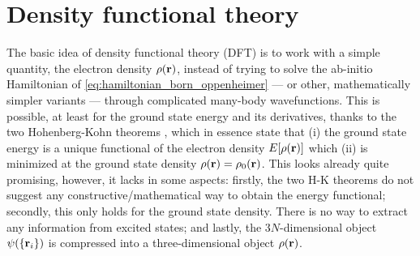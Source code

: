 \documentclass[../../main.tex]{subfiles}
\begin{document}
\section{Density functional theory}\label{sec:dft}

The basic idea of density functional theory (DFT) is to work with a simple quantity, the electron density $\rho(\textbf{r})$, instead of trying to solve the ab-initio Hamiltonian of \eqref{eq:hamiltonian_born_oppenheimer} --- or other, mathematically simpler variants --- through complicated many-body wavefunctions. This is possible, at least for the ground state energy and its derivatives, thanks to the two Hohenberg-Kohn theorems \cite{Hohenberg1964}, which in essence state that (i) the ground state energy is a unique functional of the electron density $E[\rho(\textbf{r})]$ which (ii) is minimized at the ground state density $\rho(\textbf{r})=\rho_0(\textbf{r})$. This looks already quite promising, however, it lacks in some aspects: firstly, the two H-K theorems do not suggest any constructive/mathematical way to obtain the energy functional; secondly, this only holds for the ground state density. There is no way to extract any information from excited states; and lastly, the $3N$-dimensional object $\psi(\{\textbf{r}_i\})$ is compressed into a three-dimensional object $\rho(\textbf{r})$.
\end{document}
